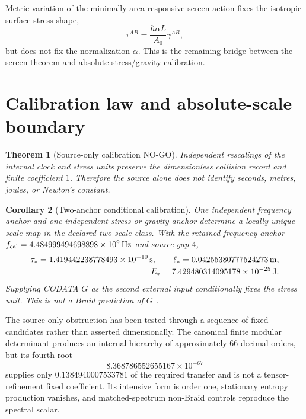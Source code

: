 \documentclass[11pt]{article}
\newtheorem{theorem}{Theorem}[section]
\newtheorem{corollary}[theorem]{Corollary}
\theoremstyle{definition}
\theoremstyle{remark}
\begin{document}
Metric variation of the minimally area-responsive screen action fixes the
isotropic surface-stress shape,
\begin{equation}
\tau^{AB}=\frac{\hbar\alpha L}{A_0}\gamma^{AB},
\label{eq:screen-stress}
\end{equation}
but does not fix the normalization $\alpha$. This is the remaining bridge
between the screen theorem and absolute stress/gravity calibration.

\section{Calibration law and absolute-scale boundary}

\begin{theorem}[Source-only calibration NO-GO]
Independent rescalings of the internal clock and stress units preserve the dimensionless collision record and finite coefficient $1$. Therefore the source alone does not identify seconds, metres, joules, or Newton's constant.
\end{theorem}

\begin{corollary}[Two-anchor conditional calibration]
One independent frequency anchor and one independent stress or gravity anchor determine a locally unique scale map in the declared two-scale class. With the retained frequency anchor $f_{\rm cal}=4.484999494698898\times10^9\,\mathrm{Hz}$ and source gap $4$,
\begin{align}
\tau_*=1.419442238778493\times10^{-10}\,\mathrm{s},
\qquad
\ell_*=0.04255380777524273\,\mathrm{m},
\notag\\[-0.15em]
E_*=7.429480314095178\times10^{-25}\,\mathrm{J}.
\end{align}
Supplying CODATA $G$ as the second external input conditionally fixes the stress unit. This is not a Braid prediction of $G$ \cite{codata2022,bipmSI}.
\end{corollary}

The source-only obstruction has been tested through a sequence of fixed
candidates rather than asserted dimensionally. The canonical finite modular
determinant produces an internal hierarchy of approximately $66$ decimal
orders, but its fourth root
\begin{equation}
8.368786552655167\times10^{-67}
\end{equation}
supplies only $0.1384940007533781$ of the required transfer and is not a
tensor-refinement fixed coefficient. Its intensive form is order one,
stationary entropy production vanishes, and matched-spectrum non-Braid
controls reproduce the spectral scalar.
\end{document}
